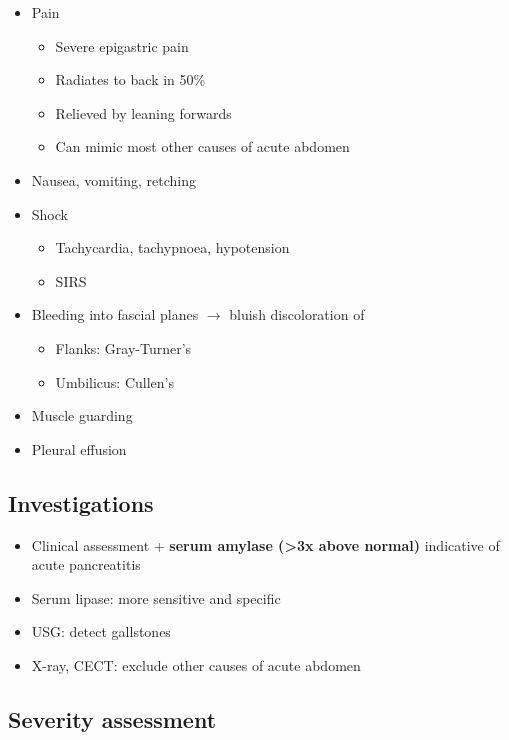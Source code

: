 \documentclass[
  14pt,
]{memoir}
\providecommand{\tightlist}{%
  \setlength{\itemsep}{0pt}\setlength{\parskip}{0pt}}
\begin{document}
\begin{itemize}
\tightlist
\item
  Pain

  \begin{itemize}
  \tightlist
  \item
    Severe epigastric pain
  \item
    Radiates to back in 50\%
  \item
    Relieved by leaning forwards
  \item
    Can mimic most other causes of acute abdomen
  \end{itemize}
\item
  Nausea, vomiting, retching
\item
  Shock

  \begin{itemize}
  \tightlist
  \item
    Tachycardia, tachypnoea, hypotension
  \item
    SIRS
  \end{itemize}
\item
  Bleeding into fascial planes \(\rightarrow\) bluish discoloration of

  \begin{itemize}
  \tightlist
  \item
    Flanks: Gray-Turner's
  \item
    Umbilicus: Cullen's
  \end{itemize}
\item
  Muscle guarding
\item
  Pleural effusion
\end{itemize}

\hypertarget{investigations-9}{%
\subsection{Investigations}\label{investigations-9}}

\begin{itemize}
\tightlist
\item
  Clinical assessment + \textbf{serum amylase (\textgreater3x above
  normal)} indicative of acute pancreatitis
\item
  Serum lipase: more sensitive and specific
\item
  USG: detect gallstones
\item
  X-ray, CECT: exclude other causes of acute abdomen
\end{itemize}

\hypertarget{severity-assessment}{%
\subsection{Severity assessment}\label{severity-assessment}}
\end{document}
